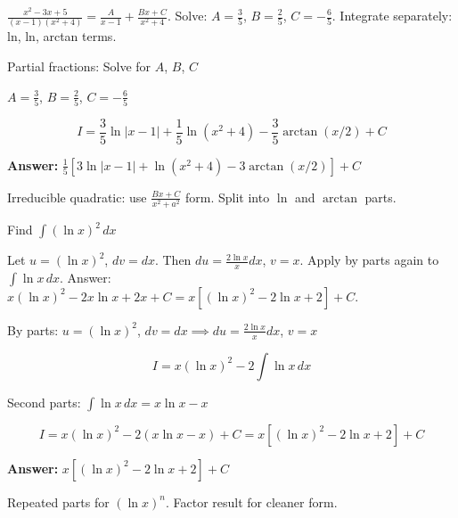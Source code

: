 \begin{hint}
$\frac{x^2-3x+5}{(x-1)(x^2+4)} = \frac{A}{x-1} + \frac{Bx+C}{x^2+4}$. Solve: $A=\frac{3}{5}$, $B=\frac{2}{5}$, $C=-\frac{6}{5}$. Integrate separately: ln, ln, arctan terms.
\end{hint}

\begin{solution}
Partial fractions: Solve for $A$, $B$, $C$

$A=\frac{3}{5}$, $B=\frac{2}{5}$, $C=-\frac{6}{5}$

\[
I = \frac{3}{5}\ln|x-1| + \frac{1}{5}\ln(x^2+4) - \frac{3}{5}\arctan(x/2) + C
\]

\textbf{Answer:} $\boxed{\frac{1}{5}[3\ln|x-1| + \ln(x^2+4) - 3\arctan(x/2)] + C}$
\end{solution}

\begin{takeaways}
Irreducible quadratic: use $\frac{Bx+C}{x^2+a^2}$ form. Split into $\ln$ and $\arctan$ parts.
\end{takeaways}

\vspace{1cm}

\begin{problem}
Find $\displaystyle \int (\ln x)^2 \, dx$
\end{problem}

\begin{hint}
Let $u = (\ln x)^2$, $dv = dx$. Then $du = \frac{2\ln x}{x}dx$, $v = x$. Apply by parts again to $\int \ln x \, dx$. Answer: $x(\ln x)^2 - 2x\ln x + 2x + C = x[(\ln x)^2 - 2\ln x + 2] + C$.
\end{hint}

\begin{solution}
By parts: $u=(\ln x)^2$, $dv=dx \implies du=\frac{2\ln x}{x}dx$, $v=x$

\[
I = x(\ln x)^2 - 2\int\ln x\,dx
\]

Second parts: $\int\ln x\,dx = x\ln x - x$

\[
I = x(\ln x)^2 - 2(x\ln x - x) + C = x[(\ln x)^2 - 2\ln x + 2] + C
\]

\textbf{Answer:} $\boxed{x[(\ln x)^2 - 2\ln x + 2] + C}$
\end{solution}

\begin{takeaways}
Repeated parts for $(\ln x)^n$. Factor result for cleaner form.
\end{takeaways}

